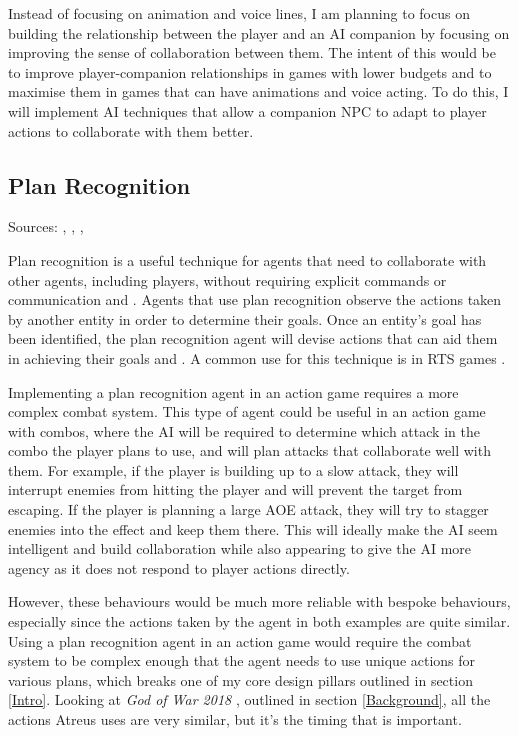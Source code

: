 \documentclass{IEEEtran}
\begin{document}
Instead of focusing on animation and voice lines, I am planning to focus on building the relationship between the player and an AI companion by focusing on improving the sense of collaboration between them. The intent of this would be to improve player-companion relationships in games with lower budgets and to maximise them in games that can have animations and voice acting. To do this, I will implement AI techniques that allow a companion NPC to adapt to player actions to collaborate with them better.

\subsection{Plan Recognition}
\label{PlanRecognition}

Sources: \cite{PandemicPlanRecognition2021}, \cite{GeneratingCollabBehaviourPlanRecognition2016}, \cite{PlayerAdaptiveRTSAI2007}, \cite{PlanRecognitionNoise}

Plan recognition is a useful technique for agents that need to collaborate with other agents, including players, without requiring explicit commands or communication \cite{PandemicPlanRecognition2021} and \cite{GeneratingCollabBehaviourPlanRecognition2016}. Agents that use plan recognition observe the actions taken by another entity in order to determine their goals. Once an entity’s goal has been identified, the plan recognition agent will devise actions that can aid them in achieving their goals \cite{PandemicPlanRecognition2021} and \cite{GeneratingCollabBehaviourPlanRecognition2016}. A common use for this technique is in RTS games \cite{PlayerAdaptiveRTSAI2007}.

Implementing a plan recognition agent in an action game requires a more complex combat system. This type of agent could be useful in an action game with combos, where the AI will be required to determine which attack in the combo the player plans to use, and will plan attacks that collaborate well with them. For example, if the player is building up to a slow attack, they will interrupt enemies from hitting the player and will prevent the target from escaping. If the player is planning a large AOE attack, they will try to stagger enemies into the effect and keep them there. This will ideally make the AI seem intelligent and build collaboration while also appearing to give the AI more agency as it does not respond to player actions directly.

However, these behaviours would be much more reliable with bespoke behaviours, especially since the actions taken by the agent in both examples are quite similar. Using a plan recognition agent in an action game would require the combat system to be complex enough that the agent needs to use unique actions for various plans, which breaks one of my core design pillars outlined in section \ref{Intro}. Looking at \textit{God of War 2018} \cite{GDCAtreus}, outlined in section \ref{Background}, all the actions Atreus uses are very similar, but it’s the timing that is important.
\end{document}
